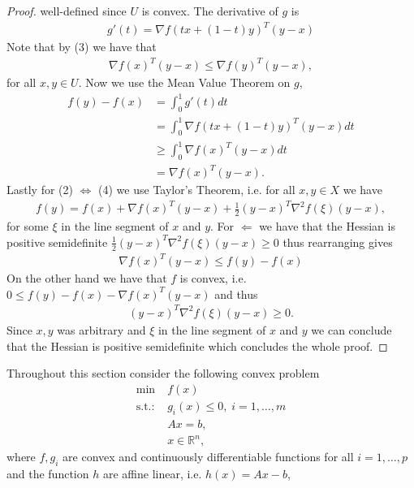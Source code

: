 \begin{proof}
well-defined since $U$ is convex. The derivative of $g$ is
\begin{align}
    g'(t) = \nabla f(t x + (1-t) y)^{T} (y-x)
\end{align}
Note that by (3) we have that
\begin{align}
    \nabla f(x)^{T} (y-x) \le \nabla f(y)^{T} (y-x),
\end{align}
for all $x, y \in U$. Now we use the Mean Value Theorem on $g$,
\begin{align}
    f(y) - f(x) &= \int_0^1 g'(t) dt\\
                &= \int_0^1 \nabla f(tx +(1-t)y)^{T}(y-x)dt\\
                &\ge \int_0^1 \nabla f(x)^{T} (y-x) dt\\
                &= \nabla f(x)^{T} (y-x).
\end{align}
Lastly for (2) $\Leftrightarrow$ (4) we use Taylor's Theorem, i.e. for all $x, y
\in X$ we have
\begin{align}
    f(y) = f(x) + \nabla f(x)^{T} (y-x) + \frac{1}{2}(y-x)^{T} \nabla^2
    f(\xi)(y-x),
\end{align}
for some $\xi$ in the line segment of $x$ and $y$. For $\Leftarrow$ we have
that the Hessian is positive semidefinite $\frac{1}{2}(y-x)^{T} \nabla^2 f(\xi)(y-x) \ge 0$
thus rearranging gives
\begin{align}
    \nabla f(x)^{T} (y-x) \le f(y) - f(x)
\end{align}
On the other hand we have that $f$ is convex, i.e. $0 \le f(y)-f(x)- \nabla
f(x)^{T} (y-x) $ and thus
\begin{align}
    (y-x)^{T} \nabla^2 f(\xi)(y-x) \ge 0.
\end{align}
Since $x, y$ was arbitrary and $\xi$ in the line segment of $x$ and $y$ we
can conclude that the Hessian is positive semidefinite which concludes the
whole proof.
\end{proof}
Throughout this section consider the following convex problem
\begin{align}
    \min\;&f(x) \label{eq: convex_constrained}\\
    \text{s.t.:}\;&g_i(x) \le 0,\; i=1,\ldots,m \nonumber\\
        &Ax = b,\; \nonumber\\
        &x \in \mathbb{R}^{n}\nonumber,
\end{align}
where $f, g_i$ are convex and continuously differentiable functions for all
$i=1,\ldots,p$ and the function $h$ are affine linear, i.e. $h(x) = Ax-b$,
